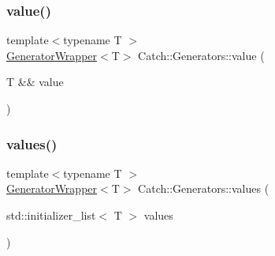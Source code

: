 \mbox{\label{namespace_catch_1_1_generators_a3c4989dd0dca44455f55484cedaa18da}} 
\subsubsection{\texorpdfstring{value()}{value()}}
{\footnotesize\ttfamily template$<$typename T $>$ \\
\mbox{\hyperlink{class_catch_1_1_generators_1_1_generator_wrapper}{Generator\+Wrapper}}$<$T$>$ Catch\+::\+Generators\+::value (\begin{DoxyParamCaption}\item[{T \&\&}]{value }\end{DoxyParamCaption})}

\mbox{\label{namespace_catch_1_1_generators_a55ca9a1132e662d9603c516161dcae35}} 
\subsubsection{\texorpdfstring{values()}{values()}}
{\footnotesize\ttfamily template$<$typename T $>$ \\
\mbox{\hyperlink{class_catch_1_1_generators_1_1_generator_wrapper}{Generator\+Wrapper}}$<$T$>$ Catch\+::\+Generators\+::values (\begin{DoxyParamCaption}\item[{std\+::initializer\+\_\+list$<$ T $>$}]{values }\end{DoxyParamCaption})}

